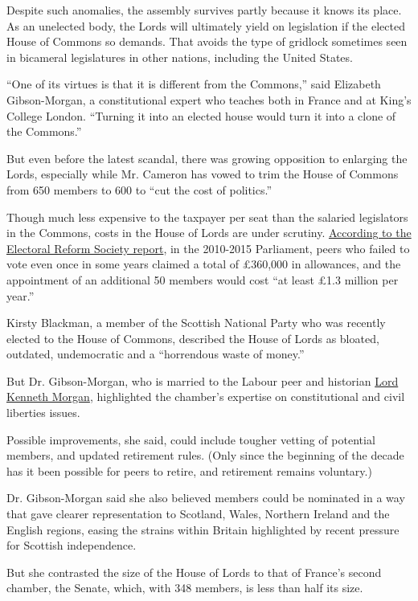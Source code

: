 Despite such anomalies, the assembly survives partly because it knows
its place. As an unelected body, the Lords will ultimately yield on
legislation if the elected House of Commons so demands. That avoids the
type of gridlock sometimes seen in bicameral legislatures in other
nations, including the United States.

``One of its virtues is that it is different from the Commons,'' said
Elizabeth Gibson-Morgan, a constitutional expert who teaches both in
France and at King's College London. ``Turning it into an elected house
would turn it into a clone of the Commons.''

But even before the latest scandal, there was growing opposition to
enlarging the Lords, especially while Mr. Cameron has vowed to trim the
House of Commons from 650 members to 600 to ``cut the cost of
politics.''

Though much less expensive to the taxpayer per seat than the salaried
legislators in the Commons, costs in the House of Lords are under
scrutiny.
\href{http://www.electoral-reform.org.uk/press-releases}{According to
the Electoral Reform Society report}, in the 2010-2015 Parliament, peers
who failed to vote even once in some years claimed a total of £360,000
in allowances, and the appointment of an additional 50 members would
cost ``at least £1.3 million per year.''

Kirsty Blackman, a member of the Scottish National Party who was
recently elected to the House of Commons, described the House of Lords
as bloated, outdated, undemocratic and a ``horrendous waste of money.''

But Dr. Gibson-Morgan, who is married to the Labour peer and historian
\href{http://www.parliament.uk/biographies/lords/lord-morgan/2555}{Lord
Kenneth Morgan}, highlighted the chamber's expertise on constitutional
and civil liberties issues.

Possible improvements, she said, could include tougher vetting of
potential members, and updated retirement rules. (Only since the
beginning of the decade has it been possible for peers to retire, and
retirement remains voluntary.)

Dr. Gibson-Morgan said she also believed members could be nominated in a
way that gave clearer representation to Scotland, Wales, Northern
Ireland and the English regions, easing the strains within Britain
highlighted by recent pressure for Scottish independence.

But she contrasted the size of the House of Lords to that of France's
second chamber, the Senate, which, with 348 members, is less than half
its size.

